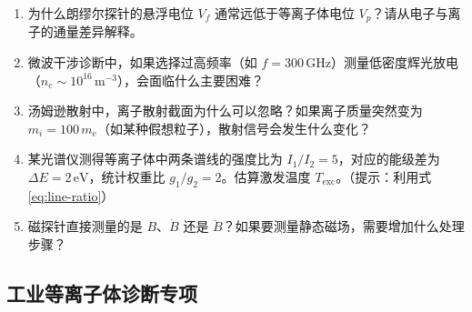 \documentclass[12pt,a4paper,openany,oneside]{book}
\begin{document}
\begin{miniquiz}
\begin{enumerate}
    \item 为什么朗缪尔探针的悬浮电位 $V_f$ 通常远低于等离子体电位 $V_p$？请从电子与离子的通量差异解释。
    
    \item 微波干涉诊断中，如果选择过高频率（如 $f = 300\,\mathrm{GHz}$）测量低密度辉光放电（$n_e \sim 10^{16}\,\mathrm{m}^{-3}$），会面临什么主要困难？
    
    \item 汤姆逊散射中，离子散射截面为什么可以忽略？如果离子质量突然变为 $m_i = 100\,m_e$（如某种假想粒子），散射信号会发生什么变化？
    
    \item 某光谱仪测得等离子体中两条谱线的强度比为 $I_1/I_2 = 5$，对应的能级差为 $\Delta E = 2\,\mathrm{eV}$，统计权重比 $g_1/g_2 = 2$。估算激发温度 $T_{\mathrm{exc}}$。（提示：利用式\eqref{eq:line-ratio}）
    
    \item 磁探针直接测量的是 $B$、$\dot{B}$ 还是 $\ddot{B}$？如果要测量静态磁场，需要增加什么处理步骤？
\end{enumerate}
\end{miniquiz}



\subsection{工业等离子体诊断专项}
\end{document}
